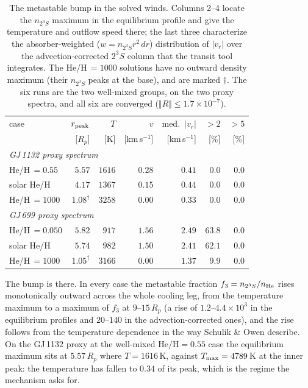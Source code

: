 \documentclass[english,a4paper]{my_memo}
\begin{document}
\begin{table}[htbp]\centering
\caption{The metastable bump in the solved winds. Columns 2--4 locate the
$n_{2^3S}$ maximum in the equilibrium profile and give the temperature and
outflow speed there; the last three characterize the absorber-weighted
($w = n_{2^3S}r^2\,dr$) distribution of $|v_r|$ over the advection-corrected
$2^3S$ column that the transit tool integrates. The He/H\,$=1000$ solutions
have no outward density maximum (their $n_{2^3S}$ peaks at the base), and are
marked $\dagger$. The six runs are the two well-mixed groups, on the two
proxy spectra, and all six are converged
($\Vert R\Vert \le 1.7\times10^{-7}$).}
\label{tab:bump}
\begin{tabular}{lrrrrrr}
\toprule
case & $r_{\rm peak}$ & $T$ & $v$ & med.\ $|v_r|$ & $>2$ & $>5$ \\
     & [$R_p$] & [K] & [km\,s$^{-1}$] & [km\,s$^{-1}$] & [\%] & [\%] \\
\midrule
\multicolumn{7}{l}{\emph{GJ\,1132 proxy spectrum}}\\
He/H\,$=0.55$   & $5.57$ & $1616$ & $0.28$ & $0.41$ & $0.0$ & $0.0$ \\
solar He/H      & $4.17$ & $1367$ & $0.15$ & $0.44$ & $0.0$ & $0.0$ \\
He/H\,$=1000$   & $1.08^\dagger$ & $3258$ & $0.00$ & $0.33$ & $0.0$ & $0.0$ \\
\midrule
\multicolumn{7}{l}{\emph{GJ\,699 proxy spectrum}}\\
He/H\,$=0.050$  & $5.82$ & $917$ & $1.56$ & $2.49$ & $63.8$ & $0.0$ \\
solar He/H      & $5.74$ & $982$ & $1.50$ & $2.41$ & $62.1$ & $0.0$ \\
He/H\,$=1000$   & $1.05^\dagger$ & $3166$ & $0.00$ & $1.37$ & $9.9$ & $0.0$ \\
\bottomrule
\end{tabular}
\end{table}

The bump is there. In every case the metastable fraction
$f_3 = n_{2^3S}/n_{\rm He}$ rises monotonically outward across the whole
cooling leg, from the temperature maximum to a maximum of $f_3$ at
$9$--$15\,R_p$ (a rise of $1.2$--$4.4\times10^{3}$ in the equilibrium
profiles and $20$--$140$ in the advection-corrected ones), and the rise
follows from the temperature dependence in the way Schulik \& Owen describe.
On the GJ\,1132 proxy at the well-mixed $\mathrm{He/H} = 0.55$ case the
equilibrium maximum sits at $5.57\,R_p$ where $T = 1616$\,K, against
$T_{\rm max} = 4789$\,K at the inner peak: the temperature has fallen to
$0.34$ of its peak, which is the regime the mechanism asks for.
\end{document}
